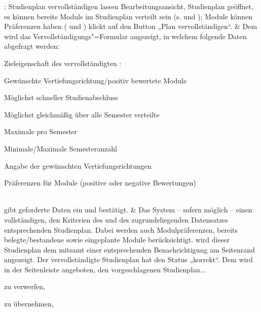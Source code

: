 \begin{usecase}{: Studienplan vervollständigen lassen}
	{Bearbeitungsansicht, \gls{Studienplan} geöffnet, es können bereits \glspl{Modul} im Studienplan verteilt sein (s.  und ); Module können Präferenzen haben ( und )}
	 klickt auf den Button „Plan vervollständigen“.
	& Dem  wird das Vervollständigungs"=Formular angezeigt, in welchem folgende Daten abgefragt werden:
	\begin{tblitemize}
		\item Zieleigenschaft des vervollständigten :
		\begin{tblitemize}
			\item {}
			\item Gewünschte Vertiefungsrichtung/positiv bewertete Module
			\item Möglichst schneller Studienabschluss
			\item Möglichst gleichmäßig über alle Semester verteilte 
		\end{tblitemize}
		\item Maximale  pro Semester
		\item Minimale/Maximale Semesteranzahl
		\item Angabe der gewünschten Vertiefungsrichtungen
		\item Präferenzen für Module (positive oder negative Bewertungen)
	\end{tblitemize} \\
	\hline
	 gibt geforderte Daten ein und bestätigt.
	& Das System  – sofern möglich – einen vollständigen, den Kriterien des  und des zugrundeliegenden Datensatzes entsprechenden \gls{Studienplan}. Dabei werden auch Modulpräferenzen, bereits belegte/bestandene sowie eingeplante Module berücksichtigt. \newline
	 wird dieser Studienplan dem  mitsamt einer entsprechenden \gls{Benachrichtigung} am Seitenrand angezeigt. Der vervollständigte Studienplan hat den Status „korrekt“. Dem  wird in der Seitenleiste angeboten, den vorgeschlagenen Studienplan...
	\begin{tblitemize}
		\item zu verwerfen,
		\item zu übernehmen,

\end{tblitemize}
\end{usecase}
